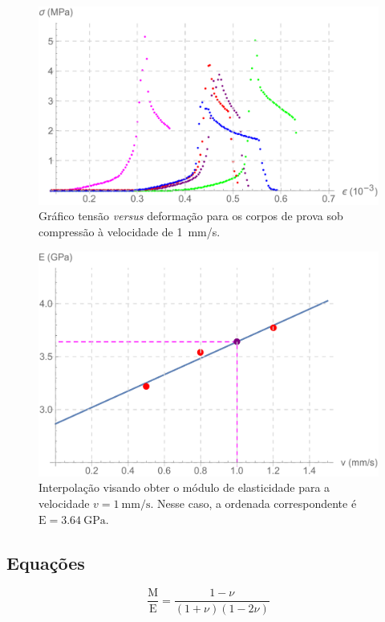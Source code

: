 \documentclass[a4paper, 12pt, brazilian]{article}
\begin{document}
	\begin{figure}[H]
		\centering
		\includegraphics[scale=.6]{images/graph}
		\caption{Gráfico tensão \textit{versus} deformação para os corpos de prova sob compressão à velocidade de \SI{1}{\milli\meter/\second}.}
		\label{fig:graph}
	\end{figure}
	
	\begin{figure}
		\centering
		\includegraphics[scale=.6]{images/interpol}
		\caption{Interpolação visando obter o módulo de elasticidade para a velocidade $v=\SI{1}{\milli\meter/\second}$. Nesse caso, a ordenada correspondente é $\textrm{E}=\SI{3.64}{\giga\pascal}$.}
		\label{fig:interpol}
	\end{figure}
	
	\subsection{Equações}
		
	\begin{equation}\label{main_eq}
		\dfrac{\textrm{M}}{\textrm{E}}=\dfrac{1-\nu}{(1+\nu)(1-2\nu)}
	\end{equation}
\end{document}

